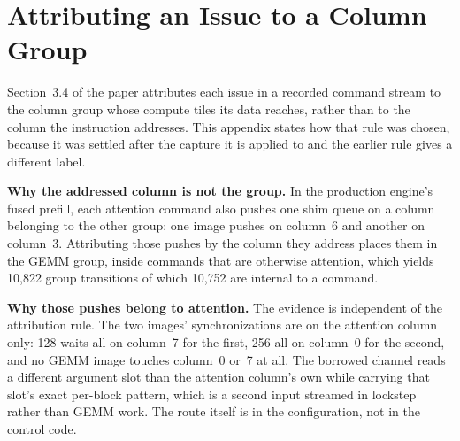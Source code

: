 \documentclass{article}
\begin{document}

\printAffiliationsAndNotice{}

\section{Attributing an Issue to a Column Group}
\label{app:attribution}

Section~3.4 of the paper attributes each issue in a recorded command stream to the column group whose compute tiles its
data reaches, rather than to the column the instruction addresses. This appendix states how that rule was chosen,
because it was settled after the capture it is applied to and the earlier rule gives a different label.

\textbf{Why the addressed column is not the group.} In the production engine's fused prefill, each attention command
also pushes one shim queue on a column belonging to the other group: one image pushes on column~6 and another on
column~3. Attributing those pushes by the column they address places them in the GEMM group, inside commands that are
otherwise attention, which yields 10{,}822 group transitions of which 10{,}752 are internal to a command.

\textbf{Why those pushes belong to attention.} The evidence is independent of the attribution rule. The two images'
synchronizations are on the attention column only: 128 waits all on column~7 for the first, 256 all on column~0 for
the second, and no GEMM image touches column~0 or~7 at all. The borrowed channel reads a different argument slot than
the attention column's own while carrying that slot's exact per-block pattern, which is a second input streamed in
lockstep rather than GEMM work. The route itself is in the configuration, not in the control code.
\end{document}
